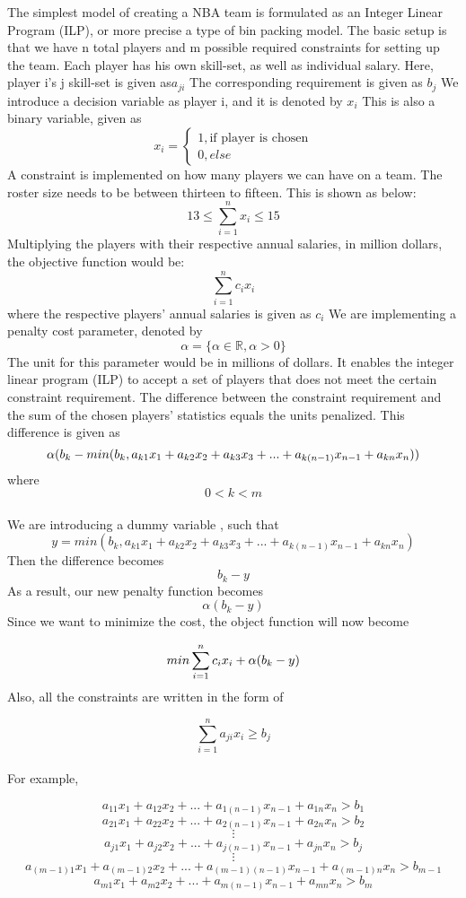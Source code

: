 \documentclass{article}
\begin{document}
The simplest model of creating a NBA team is formulated as an Integer Linear Program (ILP), or more precise a type of bin packing model. The basic setup is that we have n total players and m possible required constraints for setting up the team. Each player has his own skill-set, as well as individual salary.  Here, player i’s j skill-set is given as$a_{ji}$ The corresponding requirement is given as $b_j$ We introduce a decision variable as player i, and it is denoted by $x_i$ This is also a binary variable, given as
  \[
    x_i=\left\{
                \begin{array}{ll}
                  1, \mbox{if player is chosen}  \\
                  0, else
                \end{array}
              \right.
  \]
A constraint is implemented on how many players we can have on a team. The roster size needs to be between thirteen to fifteen. This is shown as below: 
$$ 13 \leq \sum_{i=1}^{n}x_i \leq 15$$
Multiplying the players with their respective annual salaries, in million dollars, the objective function would be: 
$$\sum_{i=1}^{n} c_i  x_i$$
where the respective players' annual salaries is given as $c_i$  
We are implementing a penalty cost parameter, denoted by $$\alpha = \{\alpha \in \mathbb{R}, \alpha > 0\}$$The unit for this parameter would be in millions of dollars. It enables the integer linear program (ILP) to accept a set of players that does not meet the certain constraint requirement. The difference between the constraint requirement and the sum of the chosen players’ statistics equals the units penalized. This difference is given as
$$ \alpha \space
(b_k \space - min (b_k, a_{k1}x_1 + a_{k2}x_2 + a_{k3}x_3 + ...+ a_{{k(n-1)}}x_{n-1} + a_{kn}x_n)) $$where $$0< k < m$$ \\We are introducing a dummy variable , such that 
$$y = min (b_k, a_{k1}x_1 + a_{k2}x_2 + a_{k3}x_3 + ...+ a_{{k(n-1)}}x_{n-1} + a_{kn}x_n )$$Then the difference becomes
$$ b_k - y$$As a result, our new penalty function becomes
$$\alpha(b_k - y)$$ Since we want to minimize the cost, the object function will now become 

$$min \sum_{i=1}^ {n} \space c_i x_i \space + \alpha \space 
(b_k \space - y)$$
Also, all the constraints are written in the form of 

$$ \sum_{i=1}^{n} a_{ji}x_i \geq b_j$$\\


For example, 

$$a_{11} x_1 + a_{12}x_2 + ... + a_{1(n-1)}x_{n-1} + a_{1n}x_n > b_1$$
$$a_{21} x_1 + a_{22}x_2 + ... + a_{2(n-1)}x_{n-1} + a_{2n}x_n > b_2$$
$$\vdots $$
$$a_{j1} x_1 + a_{j2}x_2 + ... + a_{j(n-1)}x_{n-1} + a_{jn}x_n > b_j$$
$$\vdots $$
$$a_{(m-1)1} x_1 + a_{(m-1)2}x_2 + ... + a_{(m-1)(n-1)}x_{n-1} + a_{(m-1)n}x_n > b_{m-1}$$
$$a_{m1} x_1 + a_{m2}x_2 + ... + a_{m(n-1)}x_{n-1} + a_{mn}x_n > b_m$$\\
\end{document}
